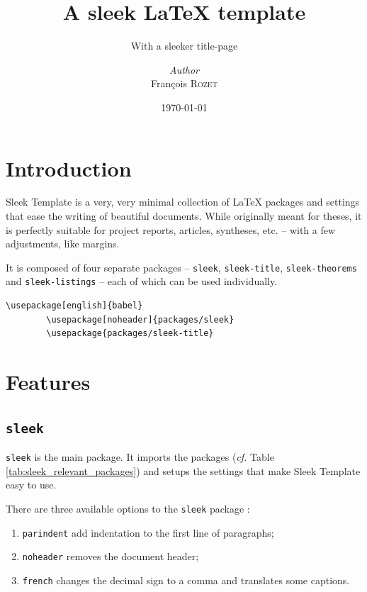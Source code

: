 \documentclass[a4paper, 12pt]{report}
\institute{Random University}
\title{A sleek \LaTeX{} template}
\subtitle{With a sleeker title-page}
\author{\textit{Author}\\François \textsc{Rozet}}
\date{\today}
\begin{document}
    \maketitle
    \romantableofcontents

    \chapter{Introduction}

    Sleek Template is a very, very minimal collection of \LaTeX{} packages and settings that ease the writing of beautiful documents. While originally meant for theses, it is perfectly suitable for project reports, articles, syntheses, etc. -- with a few adjustments, like margins.

    It is composed of four separate packages -- \texttt{sleek}, \texttt{sleek-title}, \texttt{sleek-theorems} and \texttt{sleek-listings} -- each of which can be used individually.

    \begin{lstlisting}[style=latexFrameTB, caption={Example of Sleek Template packages usage.}, gobble=8]
        \usepackage[english]{babel}
        \usepackage[noheader]{packages/sleek}
        \usepackage{packages/sleek-title}
    \end{lstlisting}


    \chapter{Features}

    \section{\texttt{sleek}}

    \texttt{sleek} is the main package. It imports the packages (\emph{cf.} Table \ref{tab:sleek_relevant_packages}) and setups the settings that make Sleek Template easy to use.

    There are three available options to the \texttt{sleek} package :

    \begin{enumerate}[noitemsep]
        \item \texttt{parindent} add indentation to the first line of paragraphs;
        \item \texttt{noheader} removes the document header;
        \item \texttt{french} changes the decimal sign to a comma and translates some captions.
    \end{enumerate}
\end{document}

